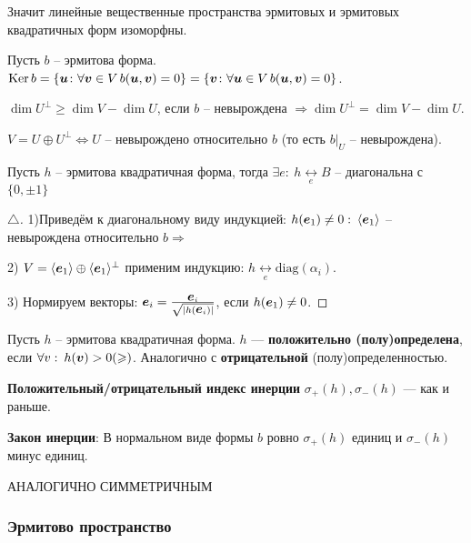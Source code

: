 Значит линейные вещественные пространства эрмитовых и эрмитовых квадратичных форм изоморфны.

Пусть $b$ -- эрмитова форма. $\mathop{\mathrm{Ker}}\nolimits b = \{\mbox{\boldmath $u$} \colon \forall \mbox{\boldmath $v$} \in V\, b(\mbox{\boldmath $u$},\mbox{\boldmath $v$}) = 0\} = \{\mbox{\boldmath $v$}\colon \forall \mbox{\boldmath $u$} \in V\, b(\mbox{\boldmath $u$},\mbox{\boldmath $v$})=0\}$.

$\dim U^\bot \geq \dim V - \dim U$, если $b$ -- невырождена $\Longrightarrow \dim U^\bot = \dim V - \dim U$.

$V = U \oplus U^\bot \Longleftrightarrow U$ -- невырождено относительно $b$ (то есть $b\big|_U$ -- невырождена).

\begin{to_thr} 
	Пусть $h$ -- эрмитова квадратичная форма, тогда $\exists e:\: h \underset{e}{\longleftrightarrow} B$ -- диагональна с $\{0, \pm 1\}$	 
\end{to_thr}

\begin{proof}[$\triangle$]
	1)Приведём к диагональному виду индукцией: $h(\mbox{\boldmath $e$}_1) \neq 0:\: \langle \mbox{\boldmath $e$}_1\rangle$ -- невырождена относительно $b \Longrightarrow$

	2) $V = \langle \mbox{\boldmath $e$}_1\rangle \oplus \langle \mbox{\boldmath $e$}_1\rangle^\bot$ применим индукцию: $h \underset{e}{\longleftrightarrow}\text{diag}(\alpha_i)$.

	3) Нормируем векторы: $\mbox{\boldmath $e$}_i = \frac{\mbox{\boldmath $e$}_i}{\sqrt{|h (\mbox{\boldmath $e$}_i)|}}$, если $h(\mbox{\boldmath $e$}_1) \neq 0$.
\end{proof}

\begin{to_def} 
	Пусть $h$ -- эрмитова квадратичная форма. $h$ --- \textbf{положительно (полу)определена}, если $\forall v:\: h(\mbox{\boldmath $v$}) >0 (\geqslant)$. Аналогично с \textbf{отрицательной} (полу)определенностью.  
\end{to_def}

\begin{to_def} 
	\textbf{Положительный/отрицательный индекс инерции} $\sigma_+(h), \sigma_-(h)$ --- как и раньше. 

	\textbf{Закон инерции}: В нормальном виде формы $b$ ровно $\sigma_+(h)$ единиц и $\sigma_-(h)$ минус единиц.
\end{to_def}

\begin{to_thr} 
	 АНАЛОГИЧНО СИММЕТРИЧНЫМ
\end{to_thr}

\subsubsection{Эрмитово пространство}

